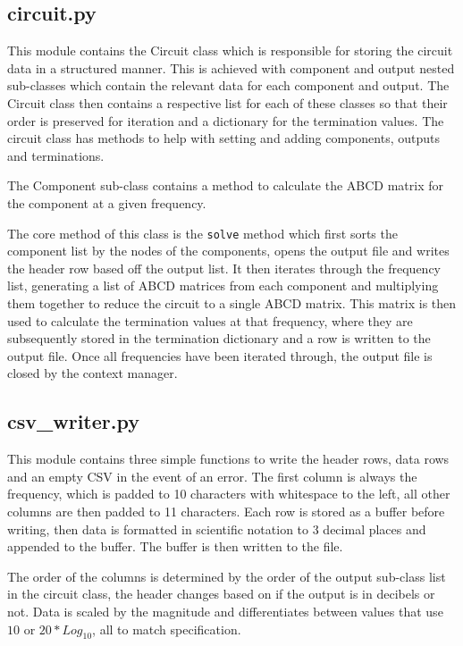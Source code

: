 \documentclass[conference]{IEEEtran}
\begin{document}
\subsection{circuit.py}
This module contains the Circuit class which is responsible for storing the circuit data in a structured manner. This is achieved
with component and output nested sub-classes which contain the relevant data for each component and output. The Circuit class then
contains a respective list for each of these classes so that their order is preserved for iteration and a dictionary for the
termination values. The circuit class has methods to help with setting and adding components, outputs and terminations.

The Component sub-class contains a method to calculate the ABCD matrix for the component at a given frequency.

The core method of this class is the \texttt{solve} method which first sorts the component list by the nodes of the components,
opens the output file and writes the header row based off the output list. It then iterates through the frequency list, generating 
a list of ABCD matrices from each component and multiplying them together to reduce the circuit to a single ABCD matrix. 
This matrix is then used to calculate the termination values at that frequency, where they are subsequently stored in the 
termination dictionary and a row is written to the output file. Once all frequencies have been iterated through, the output file is closed
by the context manager.

\subsection{csv\_writer.py}
This module contains three simple functions to write the header rows, data rows and an empty CSV in the event of an error.
The first column is always the frequency, which is padded to 10 characters with whitespace to the left,
all other columns are then padded to 11 characters. Each row is stored as a buffer before writing, then data is formatted in
scientific notation to 3 decimal places and appended to the buffer. The buffer is then written to the file.

The order of the columns is determined by the order of the output sub-class list in the circuit class, the header changes
based on if the output is in decibels or not. Data is scaled by the magnitude and differentiates between values that use 
$10$ or $20*Log_{10}$, all to match specification.
\end{document}
